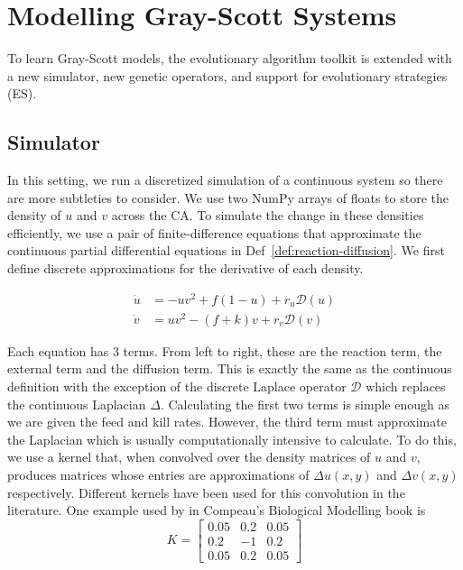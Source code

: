 \chapter{Modelling Gray-Scott Systems} \label{gray-scott}

To learn Gray-Scott models, the evolutionary algorithm toolkit is extended with a new simulator, new genetic operators, and support for evolutionary strategies (ES).

\section{Simulator} \label{sec:simulator-2}

In this setting, we run a discretized simulation of a continuous system so there are more subtleties to consider. We use two NumPy arrays of floats to store the density of $u$ and $v$ across the CA. To simulate the change in these densities efficiently, we use a pair of finite-difference equations that approximate the continuous partial differential equations in Def~\ref{def:reaction-diffusion}. We first define discrete approximations for the derivative of each density.
\begin{definition}\label{def:gs}
\begin{align*}
  \dot{u} &= -uv^2 + f(1-u) + r_u \mathcal{D}(u)\\
  \dot{v} &= uv^2 - (f+k)v + r_v \mathcal{D}(v)
\end{align*}
\end{definition}
Each equation has 3 terms. From left to right, these are the reaction term, the external term and the diffusion term. This is exactly the same as the continuous definition with the exception of the discrete Laplace operator $\mathcal{D}$ which replaces the continuous Laplacian $\Delta$. Calculating the first two terms is simple enough as we are given the feed and kill rates.  However, the third term must approximate the Laplacian which is usually computationally intensive to calculate. To do this, we use a kernel that, when convolved over the density matrices of $u$ and $v$, produces matrices whose entries are approximations of $\Delta u(x,y)$ and $\Delta v(x,y)$ respectively. Different kernels have been used for this convolution in the literature. One example used by in Compeau's Biological Modelling book\cite{compeau} is
\[
  K= \begin{bmatrix}
    0.05 & 0.2 & 0.05\\
    0.2 & -1 & 0.2\\
    0.05 & 0.2 & 0.05
  \end{bmatrix}
\]
